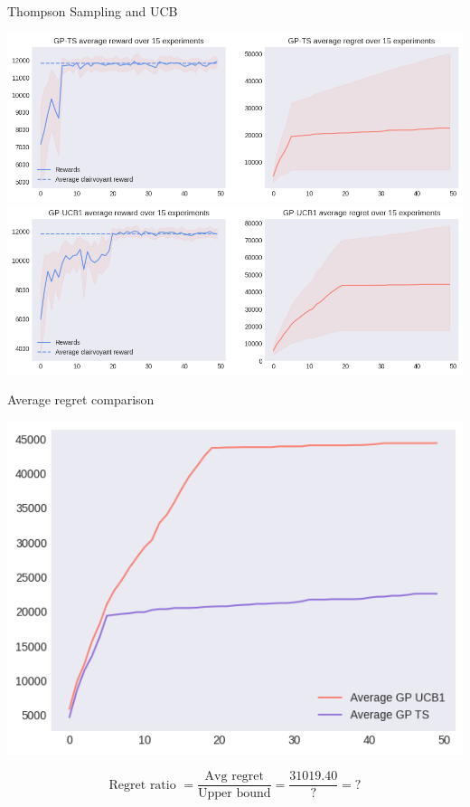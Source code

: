 Thompson Sampling and UCB

\begin{center}
	\includegraphics[scale=0.5]{img/Graphs/uncertain_alpha/image4.png}
	\includegraphics[scale=0.5]{img/Graphs/uncertain_alpha/image5.png}
\end{center}

Average regret comparison

\begin{center}
	\includegraphics[scale=0.5]{img/Graphs/uncertain_alpha/image6.png}
\end{center}

\begin{displaymath}
	\text{Regret ratio } = \frac{\text{Avg regret}}{\text{Upper bound}} = \frac{31019.40}{?} = ?
\end{displaymath}

